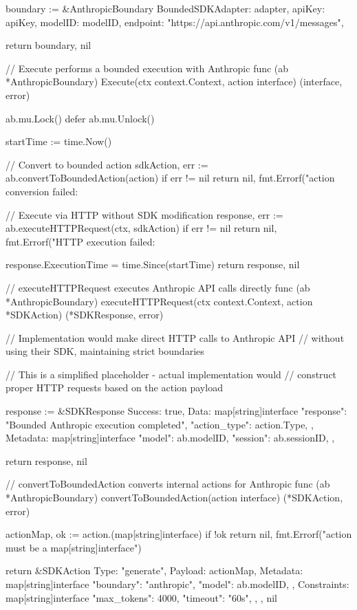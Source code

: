 {{    boundary := &AnthropicBoundary{
        BoundedSDKAdapter: adapter,
        apiKey:           apiKey,
        modelID:          modelID,
        endpoint:         "https://api.anthropic.com/v1/messages",
    }

    return boundary, nil
}

// Execute performs a bounded execution with Anthropic
func (ab *AnthropicBoundary) Execute(ctx context.Context, action interface{}) (interface{}, error) {
    ab.mu.Lock()
    defer ab.mu.Unlock()

    startTime := time.Now()

    // Convert to bounded action
    sdkAction, err := ab.convertToBoundedAction(action)
    if err != nil {
        return nil, fmt.Errorf("action conversion failed: %
    }

    // Execute via HTTP without SDK modification
    response, err := ab.executeHTTPRequest(ctx, sdkAction)
    if err != nil {
        return nil, fmt.Errorf("HTTP execution failed: %
    }

    response.ExecutionTime = time.Since(startTime)
    return response, nil
}

// executeHTTPRequest executes Anthropic API calls directly
func (ab *AnthropicBoundary) executeHTTPRequest(ctx context.Context, action *SDKAction) (*SDKResponse, error) {
    // Implementation would make direct HTTP calls to Anthropic API
    // without using their SDK, maintaining strict boundaries

    // This is a simplified placeholder - actual implementation would
    // construct proper HTTP requests based on the action payload

    response := &SDKResponse{
        Success: true,
        Data: map[string]interface{}{
            "response": "Bounded Anthropic execution completed",
            "action_type": action.Type,
        },
        Metadata: map[string]interface{}{
            "model": ab.modelID,
            "session": ab.sessionID,
        },
    }

    return response, nil
}

// convertToBoundedAction converts internal actions for Anthropic
func (ab *AnthropicBoundary) convertToBoundedAction(action interface{}) (*SDKAction, error) {
    actionMap, ok := action.(map[string]interface{})
    if !ok {
        return nil, fmt.Errorf("action must be a map[string]interface{}")
    }

    return &SDKAction{
        Type:    "generate",
        Payload: actionMap,
        Metadata: map[string]interface{}{
            "boundary": "anthropic",
            "model":    ab.modelID,
        },
        Constraints: map[string]interface{}{
            "max_tokens": 4000,
            "timeout":    "60s",
        },
    }, nil
}

}
